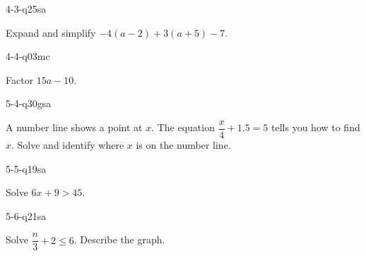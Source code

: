 \begin{practiceQuestion}{4-3-q25}{sa}
\begin{questionText}
Expand and simplify $-4(a - 2) + 3(a + 5) - 7$.
\end{questionText}
\end{practiceQuestion}

\begin{practiceQuestion}{4-4-q03}{mc}
\begin{questionText}
Factor $15a - 10$.
\end{questionText}
\end{practiceQuestion}

\begin{practiceQuestion}{5-4-q30}{gsa}
\begin{questionText}
A number line shows a point at $x$. The equation $\dfrac{x}{4} + 1.5 = 5$ tells you how to find $x$. Solve and identify where $x$ is on the number line.

\begin{center}
\end{center}
\end{questionText}
\end{practiceQuestion}

\begin{practiceQuestion}{5-5-q19}{sa}
\begin{questionText}
Solve $6x + 9 > 45$.
\end{questionText}
\end{practiceQuestion}

\begin{practiceQuestion}{5-6-q21}{sa}
\begin{questionText}
Solve $\dfrac{n}{3} + 2 \leq 6$. Describe the graph.
\end{questionText}
\end{practiceQuestion}

